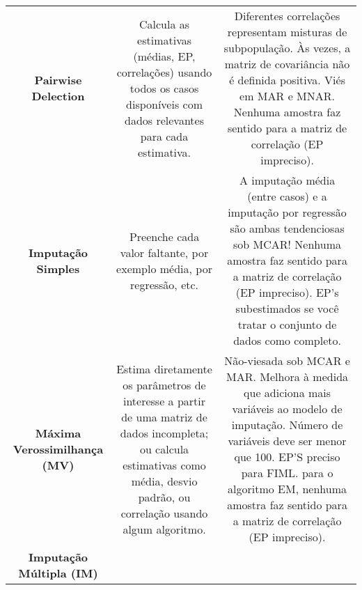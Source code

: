 \documentclass[
  openany]{book}
\begin{document}
\begin{longtable}[]{@{}ccc@{}}
\begin{minipage}[t]{0.30\columnwidth}
\textbf{Pairwise Delection}\strut
\end{minipage} & \begin{minipage}[t]{0.30\columnwidth}\centering
Calcula as estimativas (médias, EP, correlações) usando todos os casos disponíveis com dados relevantes para cada estimativa.\strut
\end{minipage} & \begin{minipage}[t]{0.30\columnwidth}\centering
Diferentes correlações representam misturas de subpopulação. Às vezes, a matriz de covariância não é definida positiva. Viés em MAR e MNAR. Nenhuma amostra faz sentido para a matriz de correlação (EP impreciso).\strut
\end{minipage}\tabularnewline
\begin{minipage}[t]{0.30\columnwidth}\centering
\textbf{Imputação Simples}\strut
\end{minipage} & \begin{minipage}[t]{0.30\columnwidth}\centering
Preenche cada valor faltante, por exemplo média, por regressão, etc.\strut
\end{minipage} & \begin{minipage}[t]{0.30\columnwidth}\centering
A imputação média (entre casos) e a imputação por regressão são ambas tendenciosas sob MCAR! Nenhuma amostra faz sentido para a matriz de correlação (EP impreciso). EP's subestimados se você tratar o conjunto de dados como completo.\strut
\end{minipage}\tabularnewline
\begin{minipage}[t]{0.30\columnwidth}\centering
\textbf{Máxima Verossimilhança (MV)}\strut
\end{minipage} & \begin{minipage}[t]{0.30\columnwidth}\centering
Estima diretamente os parâmetros de interesse a partir de uma matriz de dados incompleta; ou calcula estimativas como média, desvio padrão, ou correlação usando algum algoritmo.\strut
\end{minipage} & \begin{minipage}[t]{0.30\columnwidth}\centering
Não-viesada sob MCAR e MAR. Melhora à medida que adiciona mais variáveis ao modelo de imputação. Número de variáveis deve ser menor que 100. EP'S preciso para FIML. para o algoritmo EM, nenhuma amostra faz sentido para a matriz de correlação (EP impreciso).\strut
\end{minipage}\tabularnewline
\begin{minipage}[t]{0.30\columnwidth}\centering
\textbf{Imputação Múltipla (IM)}\strut

\end{minipage}
\end{longtable}
\end{document}
